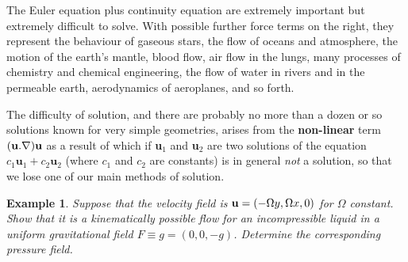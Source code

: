 \documentclass[twoside,a4paper,11pt]{report}
\newtheorem{exmp}{Example}}
\begin{document}
The Euler equation plus continuity equation are extremely important but 
extremely difficult to solve. With possible further force terms on the 
right, they represent the behaviour of gaseous stars, the flow of oceans and 
atmosphere, the motion of the earth's mantle, blood flow, air flow in the 
lungs, many processes of chemistry and chemical engineering, the flow of 
water in rivers and in the permeable earth, aerodynamics of aeroplanes, and 
so forth.

The difficulty of solution, and there are probably no more than a dozen or 
so solutions known for very simple geometries, arises from the 
\textbf{non-linear} term $({\bf u}. \nabla ){\bf u}$ as a result of which if 
\textbf{u}$_{1}$ and \textbf{u}$_{ 2}$ are two solutions of the equation 
$c_{1 }\textbf{u}_{ 1} + c_{2 }\textbf{u}_{ 2}$ (where $c_{1 }$ and 
$c_{2}$ are constants) is in general \textit{not} a solution, so that we lose one of our 
main methods of solution.

\begin{exmp}
Suppose that the velocity field is ${{\bf u}}=(-\Omega 
y,\Omega x,0)$ for $\Omega $ constant. Show that it is a 
kinematically possible flow for an incompressible liquid in a uniform 
gravitational field $F\equiv g=(0,0,-g)$. Determine the corresponding 
pressure field.
\end{exmp}




\end{document}

